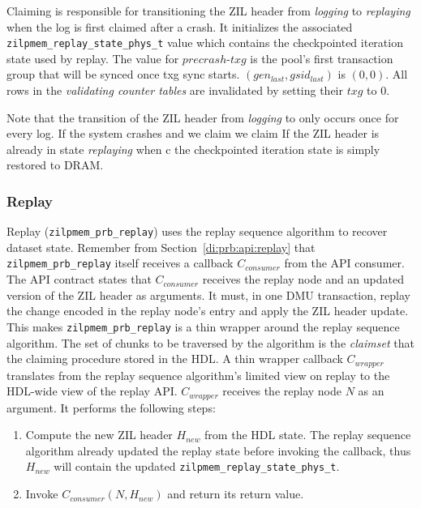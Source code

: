 \documentclass[12pt,a4paper,twoside]{book}
\begin{document}
Claiming is responsible for transitioning the ZIL header from \textit{logging} to \textit{replaying} when the log is first claimed after a crash.
It initializes the associated \lstinline{zilpmem_replay_state_phys_t} value which contains the checkpointed iteration state used by replay.
The value for $precrash\text{-}txg$ is the pool's first transaction group that will be synced once txg sync starts.
$(gen_{last}, gsid_{last})$ is $(0, 0)$.
All rows in the \textit{validating counter tables} are invalidated by setting their $txg$ to $0$.

Note that the transition of the ZIL header from \textit{logging} to \textit{}only occurs once for every log.
If the system crashes and we claim we claim 
If the ZIL header is already in state \textit{replaying} when c the checkpointed iteration state is simply restored to DRAM.

\subsubsection{Replay}
Replay (\lstinline{zilpmem_prb_replay}) uses the replay sequence algorithm to recover dataset state.
Remember from Section~\ref{di:prb:api:replay} that \lstinline{zilpmem_prb_replay} itself receives a callback $C_{consumer}$ from the API consumer.
The API contract states that $C_{consumer}$ receives the replay node and an updated version of the ZIL header as arguments.
It must, in one DMU transaction, replay the change encoded in the replay node's entry and apply the ZIL header update.
This makes \lstinline{zilpmem_prb_replay} is a thin wrapper around the replay sequence algorithm.
The set of chunks to be traversed by the algorithm is the \textit{claimset} that the claiming procedure stored in the HDL.
A thin wrapper callback $C_{wrapper}$ translates from the replay sequence algorithm's limited view on replay to the HDL-wide view of the replay API.
$C_{wrapper}$ receives the replay node $N$ as an argument. It performs the following steps:
\begin{enumerate}
    \item Compute the new ZIL header $H_{new}$ from the HDL state.
        The replay sequence algorithm already updated the replay state before invoking the callback, thus $H_{new}$ will contain the updated \lstinline{zilpmem_replay_state_phys_t}.
    \item Invoke $C_{consumer}(N, H_{new})$ and return its return value.
\end{enumerate}
\end{document}
